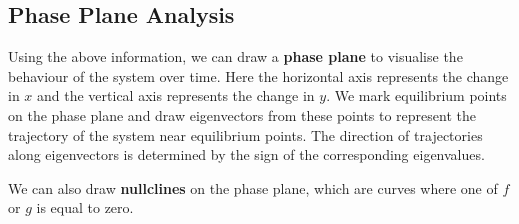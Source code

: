 \documentclass{article}
\begin{document}
\subsection{Phase Plane Analysis}
Using the above information, we can draw a \textbf{phase plane} to
visualise the behaviour of the system over time. Here the horizontal
axis represents the change in \(x\) and the vertical axis represents
the change in \(y\). We mark equilibrium points on the phase plane and
draw eigenvectors from these points to represent the trajectory of the
system near equilibrium points. The direction of trajectories along
eigenvectors is determined by the sign of the corresponding
eigenvalues.

We can also draw \textbf{nullclines} on the phase plane, which are
curves where one of \(f\) or \(g\) is equal to zero.
\end{document}
